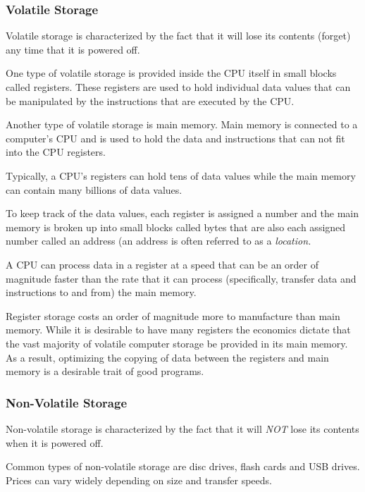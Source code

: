 \subsubsection{Volatile Storage}

Volatile storage is characterized by the fact that it will lose its
contents (forget) any time that it is powered off.

One type of volatile storage is provided inside the CPU itself in 
small blocks called \glspl{register}.  These registers are used to 
hold individual data values that can be manipulated by the instructions
that are executed by the CPU.  

Another type of volatile storage is main memory.
Main memory is connected to a computer's CPU and is used to hold
the data and instructions that can not fit into the CPU registers.

Typically, a CPU's registers can hold tens of data values while
the main memory can contain many billions of data values.

To keep track of the data values, each register is assigned a number and
the main memory is broken up into small blocks called \gls{byte}s that 
are also each assigned number called an \gls{address} 
(an address is often referred to as a {\em location.}

A CPU can process data in a register at a speed that can be an order 
of magnitude faster than the rate that it can process (specifically,
transfer data and instructions to and from) the main memory.  

Register storage costs an order of magnitude more to manufacture than
main memory.  While it is desirable to have many registers the economics 
dictate that the vast majority of volatile computer storage be provided
in its main memory.  As a result, optimizing the copying of data between 
the registers and main memory is a desirable trait of good programs.

\subsubsection{Non-Volatile Storage}

Non-volatile storage is characterized by the fact that it will {\em NOT} 
lose its contents when it is powered off.

Common types of non-volatile storage are disc drives, flash cards and USB 
drives.  Prices can vary widely depending on size and transfer speeds.

